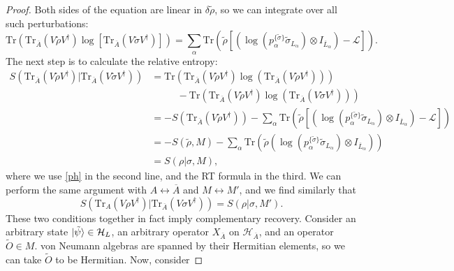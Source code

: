 \documentclass[12pt,a4paper]{report}
\numberwithin{equation}{section}
\newcommand{\ol}[1]{\overline{#1}}
\newcommand{\tr}{\text{Tr}}
\theoremstyle{definition}
\theoremstyle{theorem}
\theoremstyle{theorem}
\theoremstyle{example}
\theoremstyle{definition}
\begin{document}
\begin{proof}
	Both sides of the equation are linear in $\delta\tilde{\rho}$, so we can integrate over all such perturbations:
	\begin{equation}\label{ph}
		\tr\left(\tr_{\ol{A}}\left(V\tilde{\rho} V^{\dagger}\right)\log\left[\tr_{\ol{A}}\left(V\tilde{\sigma} V^{\dagger}\right)\right]\right)=\sum_{\alpha}\tr\left(\tilde{\rho}\left[\left(\log\left(p_{\alpha}^{\{\tilde{\sigma}\}}\tilde{\sigma}_{L_{\alpha}}\right)\otimes I_{\ol{L}_{\alpha}}\right)-\mathcal{L}\right]\right).
	\end{equation}
	The next step is to calculate the relative entropy:
	\begin{equation}
		\begin{aligned}
			S\left(\tr_{\ol{A}}\left(V\tilde{\rho} V^{\dagger}\right)|\tr_{\ol{A}}\left(V\tilde{\sigma} V^{\dagger}\right)\right)&=\tr\left(\tr_{\ol{A}}\left(V\tilde{\rho} V^{\dagger}\right)\log\left(\tr_{\ol{A}}\left(V\tilde{\rho} V^{\dagger}\right)\right)\right)\\&\phantom{==}-\tr\left(\tr_{\ol{A}}\left(V\tilde{\rho} V^{\dagger}\right)\log\left(\tr_{\ol{A}}\left(V\tilde{\sigma} V^{\dagger}\right)\right)\right)\\&=-S\left(\tr_{\ol{A}}\left(V\tilde{\rho} V^{\dagger}\right)\right)-\sum_{\alpha}\tr\left(\tilde{\rho}\left[\left(\log\left(p_{\alpha}^{\{\tilde{\sigma}\}}\tilde{\sigma}_{L_{\alpha}}\right)\otimes I_{\ol{L}_{\alpha}}\right)-\mathcal{L}\right]\right)\\&=-S(\tilde{\rho},M)-\sum_{\alpha}\tr\left(\tilde{\rho}\left(\log\left(p_{\alpha}^{\{\tilde{\sigma}\}}\tilde{\sigma}_{L_{\alpha}}\right)\otimes I_{\ol{L}_{\alpha}}\right)\right)\\&=S(\rho|\sigma,M),
		\end{aligned}
	\end{equation}
	where we use \ref{ph} in the second line, and the RT formula in the third. We can perform the same argument with ${A}\leftrightarrow \ol{A}$ and $M\leftrightarrow M'$, and we find similarly that
	\begin{equation}\label{asd}
		S(\tr_{{A}}(V\rho V^{\dagger})|\tr_{\ol{A}}(V\sigma V^{\dagger}))=S(\rho|\sigma,M').
	\end{equation}
	These two conditions together in fact imply complementary recovery. Consider an arbitrary state $\ket{\tilde{\psi}}\in\mathcal{H}_{L}$, an arbitrary operator $X_{\ol{A}}$ on $\mathcal{H}_{\ol{A}}$, and an operator $\tilde{O}\in M$. von Neumann algebras are spanned by their Hermitian elements, so we can take $\tilde{O}$ to be Hermitian. Now, consider

\end{proof}
\end{document}
